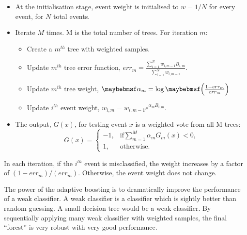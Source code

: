 \begin{itemize}
  \item At the initialisation stage,  event weight is initialised to $w = 1 / N$ for every event, for $N$ total events.
  \item Iterate $M$ times. M is the total number of trees. For iteration $m$:
    \begin{itemize}
      \item Create a $m^{th}$ tree  with weighted samples.
      \item Update $m^{th}$ tree error function, $err_m = \frac{\sum_{i = 1}^{N} w_{i,m-1} B_{i,m} }{\sum_{i = 1}^{N}w_{i,m-1}}$.
      \item Update $m^{th}$ tree weight,  $\alpha_m = \log\parenths{\frac{1 - err_m}{err_m}}$
      \item Update $i^{th}$ event weight, $w_{i,m} = w_{i,m-1} e^{\alpha_m B_{i,m} }$.
    \end{itemize}
  \item The output, $G(x)$, for testing event $x$ is a weighted vote from all M trees:
  \begin{equation}
    G(x)=
     \begin{cases}
      -1, & \mbox{if} \sum_{m=1}^{M}\alpha_mG_m(x) < 0 , \\
      1, & \mbox{otherwise}.
    \end{cases}
  \end{equation}
\end{itemize}

In each iteration, if the $i^{th}$ event is misclassified, the weight increases by a factor of $(1 - err_m)/(err_m)$. Otherwise, the event weight does not change.

The power of the adaptive boosting  is to dramatically improve the performance of a weak classifier. A weak classifier is a classifier which is sightly better than random guessing. A small decision tree would be a weak classifier. By sequentially applying many weak classifier with weighted samples, the final ``forest'' is very robust with very good performance.


